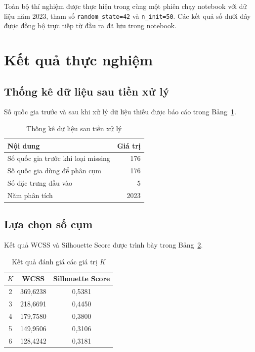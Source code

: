 \documentclass[11pt,a4paper]{article}
\begin{document}
Toàn bộ thí nghiệm được thực hiện trong cùng một phiên chạy notebook với dữ liệu năm 2023, tham số \texttt{random\_state=42} và \texttt{n\_init=50}. Các kết quả số dưới đây được đồng bộ trực tiếp từ đầu ra đã lưu trong notebook.

\section{Kết quả thực nghiệm}

\subsection{Thống kê dữ liệu sau tiền xử lý}

Số quốc gia trước và sau khi xử lý dữ liệu thiếu được báo cáo trong Bảng~\ref{tab:data_stats}.

\begin{table}[H]
\centering
\caption{Thống kê dữ liệu sau tiền xử lý}
\label{tab:data_stats}
\begin{tabular}{lr}
\toprule
\textbf{Nội dung} & \textbf{Giá trị} \\
\midrule
Số quốc gia trước khi loại missing & 176 \\
Số quốc gia dùng để phân cụm & 176 \\
Số đặc trưng đầu vào & 5 \\
Năm phân tích & 2023 \\
\bottomrule
\end{tabular}
\end{table}

\subsection{Lựa chọn số cụm}

Kết quả WCSS và Silhouette Score được trình bày trong Bảng~\ref{tab:k_results}.

\begin{table}[H]
\centering
\caption{Kết quả đánh giá các giá trị $K$}
\label{tab:k_results}
\begin{tabular}{ccc}
\toprule
$K$ & \textbf{WCSS} & \textbf{Silhouette Score} \\
\midrule
2 & 369,6238 & 0,5381 \\
3 & 218,6691 & 0,4450 \\
4 & 179,7580 & 0,3800 \\
5 & 149,9506 & 0,3106 \\
6 & 128,4242 & 0,3181 \\
\bottomrule
\end{tabular}
\end{table}
\end{document}
